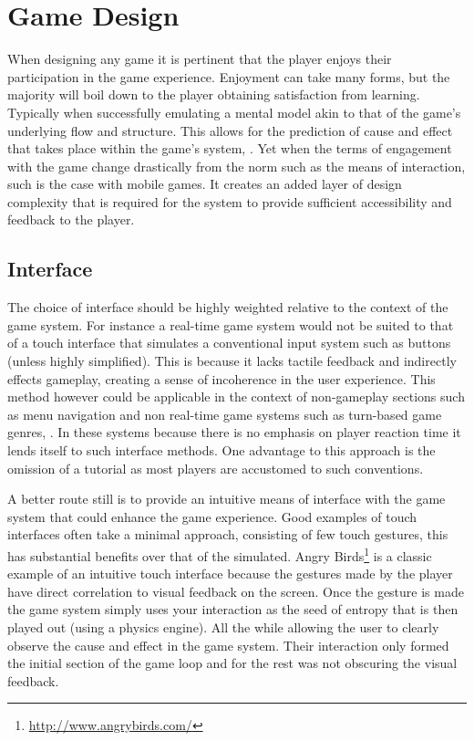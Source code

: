 \documentclass[final]{cmpreport}
\begin{document}
\section{Game Design}
When designing any game it is pertinent that the player enjoys their participation in the game experience. Enjoyment can take many forms, but the majority will boil down to the player obtaining satisfaction from learning. Typically when successfully emulating a mental model akin to that of the game's underlying flow and structure. This allows for the prediction of cause and effect that takes place within the game's system, \cite{Cook}. Yet when the terms of engagement with the game change drastically from the norm such as the means of interaction, such is the case with mobile games. It creates an added layer of design complexity that is required for the system to provide sufficient accessibility and feedback to the player.

\subsection{Interface}

The choice of interface should be highly weighted relative to the context of the game system. For instance a real-time game system would not be suited to that of a touch interface that simulates a conventional input system such as buttons (unless highly simplified). This is because it lacks tactile feedback and indirectly effects gameplay, creating a sense of incoherence in the user experience. This method however could be applicable in the context of non-gameplay sections such as menu navigation and non real-time game systems such as turn-based game genres, \cite{XuBradburn}. In these systems because there is no emphasis on player reaction time it lends itself to such interface methods. One advantage to this approach is the omission of a tutorial as most players are accustomed to such conventions.

A better route still is to provide an intuitive means of interface with the game system that could enhance the game experience. Good examples of touch interfaces often take a minimal approach, consisting of few touch gestures, this has substantial benefits over that of the simulated. Angry Birds\footnote{\url{http://www.angrybirds.com/}} is a classic example of an intuitive touch interface because the gestures made by the player have direct correlation to visual feedback on the screen. Once the gesture is made the game system simply uses your interaction as the seed of entropy that is then played out (using a physics engine). All the while allowing the user to clearly observe the cause and effect in the game system. Their interaction only formed the initial section of the game loop and for the rest was not obscuring the visual feedback.
\end{document}
